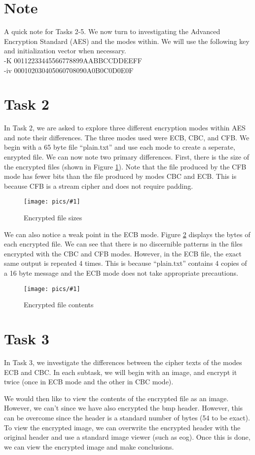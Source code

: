 \documentclass[11pt]{article}
\newcommand{\fig}[2]{ 
\begin{figure}[h]
	\centering
	\caption{#2}
	\texttt{[image: pics/\#1]}
	\label{fig:#1}
\end{figure} 
}
\begin{document}
\section*{Note}
A quick note for Tasks 2-5. We now turn to investigating the Advanced Encryption Standard (AES) and the modes within. We will use the following key and initialization vector when necessary. \\
\indent -K 00112233445566778899AABBCCDDEEFF \\
\indent -iv 000102030405060708090A0B0C0D0E0F
\section*{Task 2}

In Task 2, we are asked to explore three different encryption modes within AES and note their differences. The three modes used were ECB, CBC, and CFB. We begin with a 65 byte file ``plain.txt'' and use each mode to create a seperate, enrypted file. We can now note two primary differences. First, there is the size of the encrypted files (shown in Figure \ref{fig:task2.1}). Note that the file produced by the CFB mode has fewer bits than the file produced by modes CBC and ECB. This is because CFB is a stream cipher and does not require padding.

\fig{task2.1}{Encrypted file sizes}

We can also notice a weak point in the ECB mode. Figure \ref{fig:task2.2} displays the bytes of each encrypted file. We can see that there is no discernible patterns in the files encrypted with the CBC and CFB modes. However, in the ECB file, the exact same output is repeated 4 times. This is because ``plain.txt'' contains 4 copies of a 16 byte message and the ECB mode does not take appropriate precautions.

\fig{task2.2}{Encrypted file contents}

\newpage
\section*{Task 3}

In Task 3, we investigate the differences between the cipher texts of the modes ECB and CBC. In each subtask, we will begin with an image, and encrypt it twice (once in ECB mode and the other in CBC mode). 

We would then like to view the contents of the encrypted file as an image. However, we can't since we have also encrypted the bmp header. However, this can be overcome since the header is a standard number of bytes (54 to be exact). To view the encrypted image, we can overwrite the encrypted header with the original header and use a standard image viewer (such as eog). Once this is done, we can view the encrypted image and make conclusions.
\end{document}
